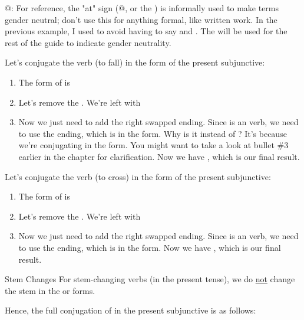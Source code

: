 \begin{conf}{@: }
	For reference, the "at" sign (@, or the ) is informally used to make terms gender neutral; don't use this for anything formal, like written work. In the previous example, I used  to avoid having to say  and . The  will be used for the rest of the guide to indicate gender neutrality.
\end{conf}

Let's conjugate the verb  (to fall) in the  form of the present subjunctive:
\begin{enumerate}[noitemsep]
	\item The  form of  is 
	\item Let's remove the . We're left with 
	\item Now we just need to add the right swapped ending. Since  is an  verb, we need to use the  ending, which is  in the  form. Why is it  instead of ? It's because we're conjugating in the  form. You might want to take a look at bullet \#3 earlier in the chapter for clarification. Now we have , which is our final result. 
\end{enumerate}

Let's conjugate the verb  (to cross) in the  form of the present subjunctive:
\begin{enumerate}[noitemsep]
	\item The  form of  is 
	\item Let's remove the . We're left with 
	\item Now we just need to add the right swapped ending. Since  is an  verb, we need to use the  ending, which is  in the  form. Now we have , which is our final result. 
\end{enumerate}

\begin{conf}{Stem Changes}
	For stem-changing verbs (in the present tense), we do \underline{not} change the stem in the  or  forms. 
\end{conf}

Hence, the full conjugation of  in the present subjunctive is as follows: 


